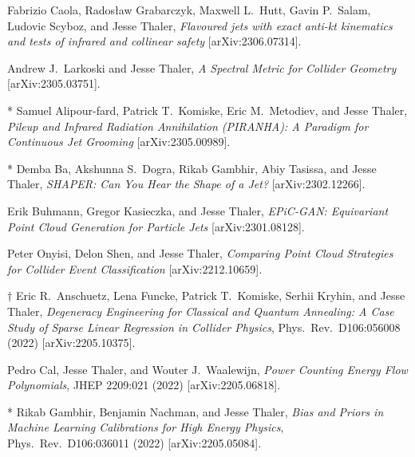 \setcounter{jessecount}{125}

\begin{list}{[]\addtocounter{jessecount}{-1}}{\leftmargin=3em \itemsep=4pt}

\item
 Fabrizio Caola, Radosław Grabarczyk, Maxwell L.\ Hutt, Gavin P.\ Salam, Ludovic Scyboz, and Jesse Thaler,
\emph{Flavoured jets with exact anti-kt kinematics and tests of infrared and collinear safety}
[arXiv:2306.07314].

\item
 Andrew J.\ Larkoski and Jesse Thaler,
\emph{A Spectral Metric for Collider Geometry}
[arXiv:2305.03751].

\item
* Samuel Alipour-fard, Patrick T.\ Komiske, Eric M.\ Metodiev, and Jesse Thaler,
\emph{Pileup and Infrared Radiation Annihilation (PIRANHA): A Paradigm for Continuous Jet Grooming}
[arXiv:2305.00989].

\item
* Demba Ba, Akshunna S.\ Dogra, Rikab Gambhir, Abiy Tasissa, and Jesse Thaler,
\emph{SHAPER: Can You Hear the Shape of a Jet?}
[arXiv:2302.12266].

\item
 Erik Buhmann, Gregor Kasieczka, and Jesse Thaler,
\emph{EPiC-GAN: Equivariant Point Cloud Generation for Particle Jets}
[arXiv:2301.08128].

\item
 Peter Onyisi, Delon Shen, and Jesse Thaler,
\emph{Comparing Point Cloud Strategies for Collider Event Classification}
[arXiv:2212.10659].

\item
$\dagger$ Eric R.\ Anschuetz, Lena Funcke, Patrick T.\ Komiske, Serhii Kryhin, and Jesse Thaler,
\emph{Degeneracy Engineering for Classical and Quantum Annealing: A Case Study of Sparse Linear Regression in Collider Physics},
Phys.\ Rev.\ D106:056008 (2022)
[arXiv:2205.10375].

\item
 Pedro Cal, Jesse Thaler, and Wouter J.\ Waalewijn,
\emph{Power Counting Energy Flow Polynomials},
JHEP 2209:021 (2022)
[arXiv:2205.06818].

\item
* Rikab Gambhir, Benjamin Nachman, and Jesse Thaler,
\emph{Bias and Priors in Machine Learning Calibrations for High Energy Physics},
Phys.\ Rev.\ D106:036011 (2022)
[arXiv:2205.05084].


\end{list}
